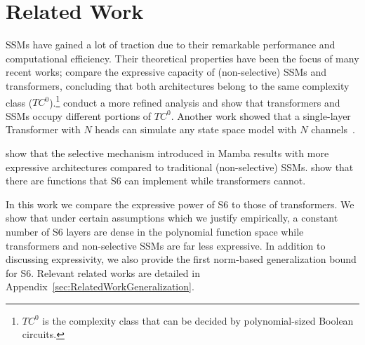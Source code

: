 \section{Related Work}
\vspace{-3pt}
SSMs have gained a lot of traction due to their remarkable performance and computational efficiency. Their theoretical properties have been the focus of many recent works; \citet{merrill2024illusion} compare the expressive capacity of (non-selective) SSMs and transformers, concluding that both architectures belong to the same complexity class ($TC^0$).\footnote{$TC^0$ is the complexity class that can be decided by polynomial-sized Boolean circuits.} \citet{sarrof2024expressive} conduct a more refined analysis and show that transformers and SSMs occupy different portions of $TC^0$. Another work showed that a single-layer Transformer with $N$ heads can simulate any state space model with $N$ channels~\citep{zimerman2023long}. 
 

\citet{cirone2024theoretical} show that the selective mechanism introduced in Mamba results with more expressive architectures compared to traditional (non-selective) SSMs.
\citet{ali2024hidden} show that there are functions that S6 can implement while transformers cannot.

In this work we compare the expressive power of S6 to those of transformers. We show that under certain assumptions which we justify empirically, a constant number of S6 layers are dense in the polynomial function space while transformers and non-selective SSMs are far less expressive. %
%
In addition to discussing expressivity, we also provide the first norm-based generalization bound for S6. Relevant related works are detailed in Appendix~\ref{sec:RelatedWorkGeneralization}.




